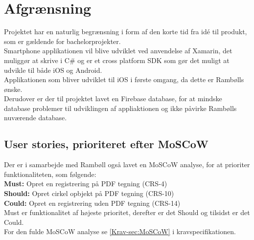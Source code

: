 \section{Afgrænsning}
Projektet har en naturlig begrænsning i form af den korte tid fra idé til produkt, som er gældende for bachelorprojekter.\\
Smartphone applikationen vil blive udviklet ved anvendelse af Xamarin, det muliggør at skrive i C\# og er et cross platform SDK som gør det muligt at udvikle til både iOS og Android. \\
Applikationen som bliver udviklet til iOS i første omgang, da dette er Rambølls ønske. \\
Derudover er der til projektet lavet en Firebase database, for at mindske database problemer til udviklingen af appliaktionen og ikke påvirke Rambølls nuværende database.

\subsection{User stories, prioriteret efter MoSCoW}
Der er i samarbejde med Rambøll også lavet en MoSCoW \cite{MoSCoW} analyse, for at prioriter funktionaliteten, som følgende: \\
\textbf{Must:} Opret en registrering på PDF tegning (CRS-4) \\
\textbf{Should:} Opret cirkel opbjekt på PDF tegning (CRS-10) \\
\textbf{Could:} Opret en registrering uden PDF tegning (CRS-14) \\
Must er funktionalitet af højeste prioritet, derefter er det Should og tilsidst er det Could. \\
For den fulde MoSCoW analyse se \ref{Krav-sec:MoSCoW} i kravspecifikationen. 
	